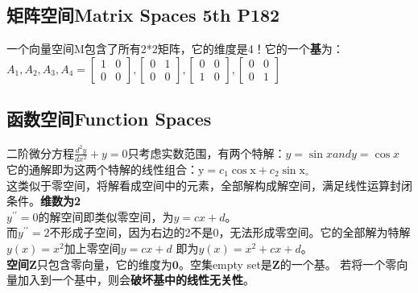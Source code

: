     \subsection{矩阵空间Matrix Spaces 5th P182}
    一个向量空间M包含了所有2*2矩阵，它的维度是4！\quad 它的一个\textbf{基}为：
    $A_{1}, A_{2}, A_{3}, A_{4}=\left[\begin{array}{ll}{1} & {0} \\ {0} & {0}\end{array}\right],\left[\begin{array}{ll}{0} & {1} \\ {0} & {0}\end{array}\right],\left[\begin{array}{ll}{0} & {0} \\ {1} & {0}\end{array}\right],\left[\begin{array}{ll}{0} & {0} \\ {0} & {1}\end{array}\right]$

    \subsection{函数空间Function Spaces}
    二阶微分方程$\frac{d^{2} y}{d x^{2}}+y=0$只考虑实数范围，有两个特解：$y=\sin x and y=\cos x$
    \\
    它的通解即为这两个特解的线性组合：$\mathrm{y}=c_{1} \cos \mathrm{x}+c_{2} \sin \mathrm{x}_{\circ}$
    \\
    这类似于零空间，将解看成空间中的元素，全部解构成解空间，满足线性运算封闭条件。\textbf{维数为2}\\
    $y^{\prime \prime}=0$的解空间即类似零空间，为$y=c x+d$。\\
    而$y^{\prime \prime}=2$不形成子空间，因为右边的2不是0，无法形成零空间。它的全部解为特解$y(x)=x^{2}$加上零空间$y=c x+d$
    即为$y(x)=x^{2}+c x+d$。\\
    \textbf{空间}$\bm{Z}$只包含零向量，它的维度为$\bm{0}$。空集empty set是$\bm{Z}$的一个基。
    若将一个零向量加入到一个基中，则会\textbf{破坏基中的线性无关性}。\\

